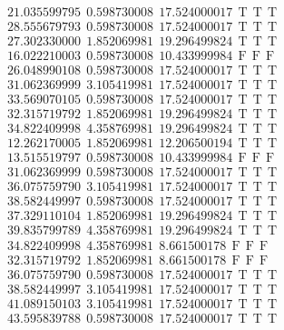 \documentclass[10pt,a4paper]{article}
\begin{document}
\begin{itemize}
\begin{displaymath}
{\begin{aligned}
&21.035599795 ~~   0.598730008 ~~  17.524000017  ~~\mathrm{T  ~~ T  ~~ T } \\ 
&28.555679793 ~~   0.598730008 ~~  17.524000017  ~~\mathrm{T  ~~ T  ~~ T } \\ 
&27.302330000 ~~   1.852069981 ~~  19.296499824  ~~\mathrm{T  ~~ T  ~~ T } \\ 
&16.022210003 ~~   0.598730008 ~~  10.433999984  ~~\mathrm{F  ~~ F  ~~  F} \\ 
&26.048990108 ~~   0.598730008 ~~  17.524000017  ~~\mathrm{T  ~~ T  ~~ T } \\ 
&31.062369999 ~~   3.105419981 ~~  17.524000017  ~~\mathrm{T  ~~ T  ~~ T } \\ 
&33.569070105 ~~   0.598730008 ~~  17.524000017  ~~\mathrm{T  ~~ T  ~~ T } \\ 
&32.315719792 ~~   1.852069981 ~~  19.296499824  ~~\mathrm{T  ~~ T  ~~ T } \\ 
&34.822409998 ~~   4.358769981 ~~  19.296499824  ~~\mathrm{T  ~~ T  ~~ T } \\ 
&12.262170005 ~~   1.852069981 ~~  12.206500194  ~~\mathrm{T  ~~ T  ~~ T } \\ 
&13.515519797 ~~   0.598730008 ~~  10.433999984  ~~\mathrm{F  ~~ F  ~~  F} \\ 
&31.062369999 ~~   0.598730008 ~~  17.524000017  ~~\mathrm{T  ~~ T  ~~ T } \\ 
&36.075759790 ~~   3.105419981 ~~  17.524000017  ~~\mathrm{T  ~~ T  ~~ T } \\ 
&38.582449997 ~~   0.598730008 ~~  17.524000017  ~~\mathrm{T  ~~ T  ~~ T } \\ 
&37.329110104 ~~   1.852069981 ~~  19.296499824  ~~\mathrm{T  ~~ T  ~~ T } \\ 
&39.835799789 ~~   4.358769981 ~~  19.296499824  ~~\mathrm{T  ~~ T  ~~ T } \\ 
&34.822409998 ~~   4.358769981 ~~   8.661500178  ~~\mathrm{F  ~~ F  ~~  F} \\ 
&32.315719792 ~~   1.852069981 ~~   8.661500178  ~~\mathrm{F  ~~ F  ~~  F} \\ 
&36.075759790 ~~   0.598730008 ~~  17.524000017  ~~\mathrm{T  ~~ T  ~~ T } \\ 
&38.582449997 ~~   3.105419981 ~~  17.524000017  ~~\mathrm{T  ~~ T  ~~ T } \\ 
&41.089150103 ~~   3.105419981 ~~  17.524000017  ~~\mathrm{T  ~~ T  ~~ T } \\ 
&43.595839788 ~~   0.598730008 ~~  17.524000017  ~~\mathrm{T  ~~ T  ~~ T } \\ 

\end{aligned}}
\end{displaymath}
\end{itemize}
\end{document}

